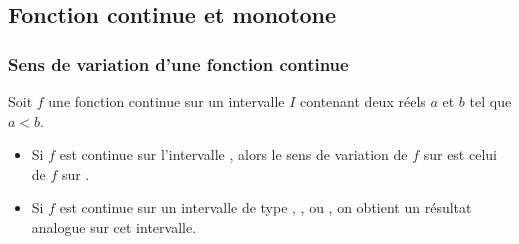 \subsection{Fonction continue et monotone}
\subsubsection{Sens de variation d'une fonction continue}
\vspace*{-0.5cm}
\begin{propriete}[s]
	Soit $f$ une fonction continue sur un intervalle $I$ contenant deux réels $a$ et $b$ tel que $a<b$.
	\begin{itemize}
		\item Si $f$ est continue sur l'intervalle , alors le sens de variation de $f$ sur  est celui de $f$ sur .
		\item Si $f$ est continue sur un intervalle de type , ,  ou , on obtient un résultat analogue sur cet intervalle.
	\end{itemize}
\end{propriete}\vspace*{-0.3cm}
